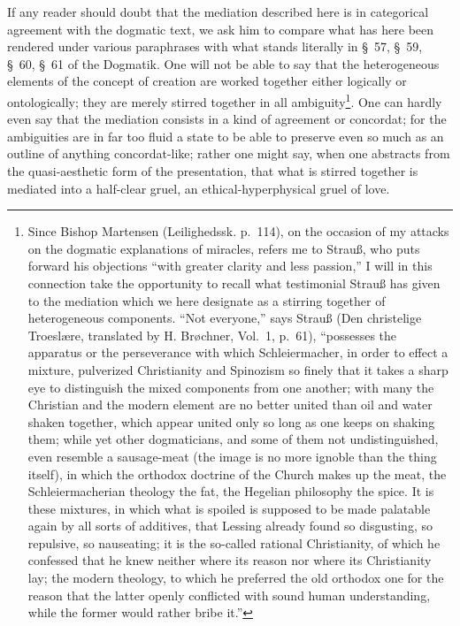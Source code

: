 \documentclass[12pt]{book}
\newcommand{\opage}[1]{\marginnote{\footnotesize\textit{[#1]}}}
\begin{document}
If any reader should doubt that the mediation described here is in categorical agreement with the dogmatic text, we ask him to compare what has here been rendered under various paraphrases with what stands literally in §~57, §~59, §~60, §~61 of the Dogmatik. One
\opage{100}\setcounter{footnote}{0}%
will not be able to say that the heterogeneous elements of the concept of creation are worked together either logically or ontologically; they are merely stirred together in all ambiguity\footnote{Since Bishop Martensen (Leilighedssk. p.~114), on the occasion of my attacks on the dogmatic explanations of miracles, refers me to Strauß, who puts forward his objections ``with greater clarity and less passion,'' I will in this connection take the opportunity to recall what testimonial Strauß has given to the mediation which we here designate as a stirring together of heterogeneous components. ``Not everyone,'' says Strauß (Den christelige Troeslære, translated by H. Brøchner, Vol.~1, p.~61), ``possesses the apparatus or the perseverance with which Schleiermacher, in order to effect a mixture, pulverized Christianity and Spinozism so finely that it takes a sharp eye to distinguish the mixed components from one another; with many the Christian and the modern element are no better united than oil and water shaken together, which appear united only so long as one keeps on shaking them; while yet other dogmaticians, and some of them not undistinguished, even resemble a sausage-meat (the image is no more ignoble than the thing itself), in which the orthodox doctrine of the Church makes up the meat, the Schleiermacherian theology the fat, the Hegelian philosophy the spice. It is these mixtures, in which what is spoiled is supposed to be made palatable again by all sorts of additives, that Lessing already found so disgusting, so repulsive, so nauseating; it is the so-called rational Christianity, of which he confessed that he knew neither where its reason nor where its Christianity lay; the modern theology, to which he preferred the old orthodox one for the reason that the latter openly conflicted with sound human understanding, while the former would rather bribe it.''}. One can hardly even say that the mediation consists in a kind of agreement or concordat; for the ambiguities are in far too fluid a state to be able to preserve even so much as an outline of anything concordat-like; rather one might say, when one abstracts from the quasi-aesthetic form of the presentation, that what is
\opage{101}\setcounter{footnote}{0}%
stirred together is mediated into a half-clear gruel, an ethical-hyperphysical gruel of love.
\end{document}
